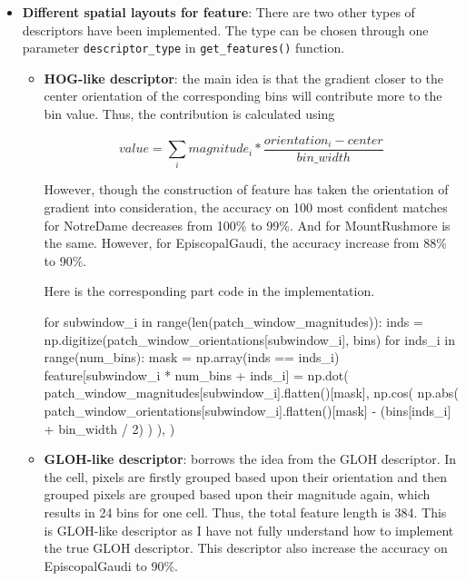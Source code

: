 \begin{enumerate}
\begin{itemize}
       \item \textbf{Different spatial layouts for feature}: 
       There are two other types of descriptors have been implemented. The type can be chosen through one parameter \verb|descriptor_type| in \verb|get_features()| function.
       \begin{itemize}
        \item \textbf{HOG-like descriptor}: the main idea is that the gradient closer to the center orientation of the corresponding bins will contribute more to the bin value. Thus, the contribution is calculated using
       
        \[ value = \sum_i magnitude_i * \frac{orientation_i - center}{bin\_width} \]
        
         However, though the construction of feature has taken the orientation of gradient into consideration, the accuracy on 100 most confident matches for NotreDame decreases from 100\% to 99\%. And for MountRushmore is the same. However, for EpiscopalGaudi, the accuracy increase from 88\% to 90\%.
 
         Here is the corresponding part code in the implementation.
        \begin{python}
 for subwindow_i in range(len(patch_window_magnitudes)):
     inds = np.digitize(patch_window_orientations[subwindow_i], bins)
     for inds_i in range(num_bins):
         mask = np.array(inds == inds_i)
         feature[subwindow_i * num_bins + inds_i] = np.dot(
         patch_window_magnitudes[subwindow_i].flatten()[mask],
         np.cos(
             np.abs(
             patch_window_orientations[subwindow_i].flatten()[mask]
                 - (bins[inds_i] + bin_width / 2)
                 )
             ),
         )
         \end{python}
 
         \item \textbf{GLOH-like descriptor}: borrows the idea from the GLOH descriptor. In the cell, pixels are firstly grouped based upon their orientation and then grouped pixels are grouped based upon their magnitude again, which results in 24 bins for one cell. Thus, the total feature length is 384. This is GLOH-like descriptor as I have not fully understand how to implement the true GLOH descriptor. This descriptor also increase the accuracy on EpiscopalGaudi to 90\%.



\end{itemize}
\end{itemize}
\end{enumerate}
